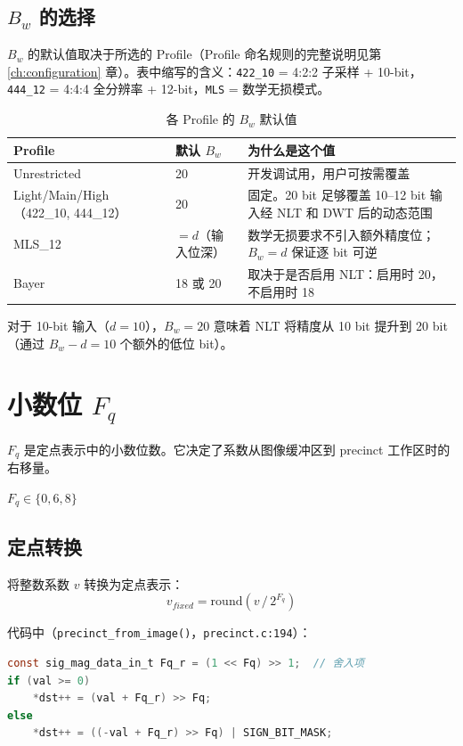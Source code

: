 \subsection{$B_w$ 的选择}

$B_w$ 的默认值取决于所选的 Profile（Profile 命名规则的完整说明见第 \ref{ch:configuration} 章）。表中缩写的含义：\texttt{422\_10} = 4:2:2 子采样 + 10-bit，\texttt{444\_12} = 4:4:4 全分辨率 + 12-bit，\texttt{MLS} = 数学无损模式。

\begin{table}[H]
\centering
\caption{各 Profile 的 $B_w$ 默认值}
\label{tab:bw-profile}
\begin{tabular}{@{}lp{2.5cm}p{6cm}@{}}
\toprule
Profile & 默认 $B_w$ & 为什么是这个值 \\
\midrule
Unrestricted & 20 & 开发调试用，用户可按需覆盖 \\
Light/Main/High（422\_10, 444\_12） & 20 & 固定。20 bit 足够覆盖 10--12 bit 输入经 NLT 和 DWT 后的动态范围 \\
MLS\_12 & $= d$（输入位深） & 数学无损要求不引入额外精度位；$B_w = d$ 保证逐 bit 可逆 \\
Bayer & 18 或 20 & 取决于是否启用 NLT：启用时 20，不启用时 18 \\
\bottomrule
\end{tabular}
\end{table}

对于 10-bit 输入（$d = 10$），$B_w = 20$ 意味着 NLT 将精度从 10 bit 提升到 20 bit（通过 $B_w - d = 10$ 个额外的低位 bit）。

\section{小数位 $F_q$}

$F_q$ 是定点表示中的小数位数。它决定了系数从图像缓冲区到 precinct 工作区时的右移量。

$F_q \in \{0, 6, 8\}$

\subsection{定点转换}

将整数系数 $v$ 转换为定点表示：
\begin{equation}
v_{\mathit{fixed}} = \mathrm{round}(v \,/\, 2^{F_q})
\end{equation}

代码中（\texttt{precinct\_from\_image()}，\texttt{precinct.c:194}）：

\begin{lstlisting}[language=C]
const sig_mag_data_in_t Fq_r = (1 << Fq) >> 1;  // 舍入项
if (val >= 0)
    *dst++ = (val + Fq_r) >> Fq;
else
    *dst++ = ((-val + Fq_r) >> Fq) | SIGN_BIT_MASK;
\end{lstlisting}

